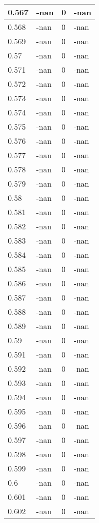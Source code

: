 \documentclass[a4paper,14pt]{extarticle}
\begin{document}
\begin{longtable}{||m{3cm}||m{3cm}|m{3cm}||m{3cm}||}
\hline
0.567 & -nan & 0 & -nan\\
\hline
0.568 & -nan & 0 & -nan\\
\hline
0.569 & -nan & 0 & -nan\\
\hline
0.57 & -nan & 0 & -nan\\
\hline
0.571 & -nan & 0 & -nan\\
\hline
0.572 & -nan & 0 & -nan\\
\hline
0.573 & -nan & 0 & -nan\\
\hline
0.574 & -nan & 0 & -nan\\
\hline
0.575 & -nan & 0 & -nan\\
\hline
0.576 & -nan & 0 & -nan\\
\hline
0.577 & -nan & 0 & -nan\\
\hline
0.578 & -nan & 0 & -nan\\
\hline
0.579 & -nan & 0 & -nan\\
\hline
0.58 & -nan & 0 & -nan\\
\hline
0.581 & -nan & 0 & -nan\\
\hline
0.582 & -nan & 0 & -nan\\
\hline
0.583 & -nan & 0 & -nan\\
\hline
0.584 & -nan & 0 & -nan\\
\hline
0.585 & -nan & 0 & -nan\\
\hline
0.586 & -nan & 0 & -nan\\
\hline
0.587 & -nan & 0 & -nan\\
\hline
0.588 & -nan & 0 & -nan\\
\hline
0.589 & -nan & 0 & -nan\\
\hline
0.59 & -nan & 0 & -nan\\
\hline
0.591 & -nan & 0 & -nan\\
\hline
0.592 & -nan & 0 & -nan\\
\hline
0.593 & -nan & 0 & -nan\\
\hline
0.594 & -nan & 0 & -nan\\
\hline
0.595 & -nan & 0 & -nan\\
\hline
0.596 & -nan & 0 & -nan\\
\hline
0.597 & -nan & 0 & -nan\\
\hline
0.598 & -nan & 0 & -nan\\
\hline
0.599 & -nan & 0 & -nan\\
\hline
0.6 & -nan & 0 & -nan\\
\hline
0.601 & -nan & 0 & -nan\\
\hline
0.602 & -nan & 0 & -nan\\

\end{longtable}
\end{document}
